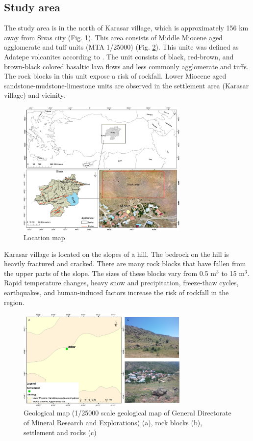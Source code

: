 \documentclass[a4paper,fleqn]{cas-sc}
\begin{document}
\subsection{Study area}
The study area is in the north of Karasar village, which is approximately 156 km away from Sivas city (Fig. \ref{fig:Figure1}). This area consists of Middle Miocene aged agglomerate and tuff units (MTA 1/25000) (Fig. \ref{fig:Figure2}). This unite was defined as Adatepe volcanites according to \cite{yilmaz2004divriugi}. The unit consists of black, red-brown, and brown-black colored basaltic lava flows and less commonly agglomerate and tuffs. The rock blocks in this unit expose a risk of rockfall. Lower Miocene aged sandstone-mudstone-limestone units are observed in the settlement area (Karasar village) and vicinity.
\begin{figure}
	\centering
	\includegraphics[width=0.75\textwidth]{figures/fig1.jpg}
	\caption{ Location map}
	\label{fig:Figure1}
\end{figure}

Karasar village is located on the slopes of a hill. The bedrock on the hill is heavily fractured and cracked. There are many rock blocks that have fallen from the upper parts of the slope. The sizes of these blocks vary from 0.5 m$^3$ to 15 m$^3$. Rapid temperature changes, heavy snow and precipitation, freeze-thaw cycles, earthquakes, and human-induced factors increase the risk of rockfall in the region.
\begin{figure}[pos=h]
	\centering
	\includegraphics[width=0.75\textwidth]{figures/fig2.jpg}
	\caption{ Geological map (1/25000 scale geological map of General Directorate of Mineral Research and Explorations) (a), rock blocks (b), settlement and rocks (c)}
	\label{fig:Figure2}
\end{figure}
\end{document}
